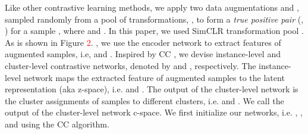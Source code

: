\documentclass{bmvc2k}
\newcommand{\shadow}[1]{}
\newcommand{\red}[1]{\textcolor{red}{#1}}
\def\s{\shadow}
\def\r{\red}
\begin{document}
\s{SHOULD n't T be, ? Have you ever used T throughout the text?  and b are not defined}

\s{Notation:} Like other contrastive learning methods, we apply two data augmentations  and , sampled randomly from a pool of transformations, , to form a \textit{true positive pair} (, ) for a sample , where  and . In this paper, we used SimCLR transformation pool \cite{SimCLR}. As is shown in Figure \r{2}. , we use the encoder network  to extract features of augmented samples, i.e,  and . Inspired by CC \cite{CC}, we devise instance-level and cluster-level contrastive networks, denoted by  and , respectively. The instance-level network maps the extracted feature of augmented samples to the latent representation (aka z-space), i.e.  and . The output of the cluster-level network is the cluster assignments of samples to different clusters, i.e.  and . We call the output of the cluster-level network c-space. We first initialize our networks, i.e. , , and  using the CC algorithm.  \s{ MOVE THIS UP:  Hereafter, we call the output of the instance-level network with z-space and the output of the cluster-level network with c-space.}    



\s{We first map the data into a latent representation  using an encoder network , so that . Here,  is the dimension of the latent representation, which is usually less than the input size, and  denotes the parameters of the neural network  and is tuned during the training phase. Ideally, the latent space  should be suitable for clustering while preserving important characteristics of . To learn such representation, we utilize the self-supervised contrastive clustering (CC) \cite{CC} method. }
\end{document}
